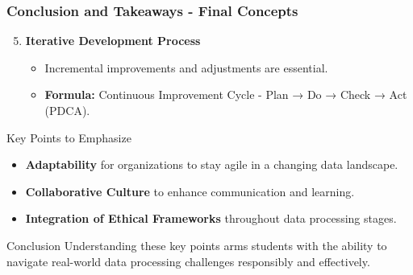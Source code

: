 \documentclass[aspectratio=169]{beamer}
\begin{document}
\begin{frame}[fragile]
    \frametitle{Conclusion and Takeaways - Final Concepts}
    \begin{enumerate}
        \setcounter{enumi}{4} %
        \item \textbf{Iterative Development Process}
        \begin{itemize}
            \item Incremental improvements and adjustments are essential.
            \item \textbf{Formula:} Continuous Improvement Cycle - Plan → Do → Check → Act (PDCA).
        \end{itemize}
    \end{enumerate}
    
    \begin{block}{Key Points to Emphasize}
        \begin{itemize}
            \item \textbf{Adaptability} for organizations to stay agile in a changing data landscape.
            \item \textbf{Collaborative Culture} to enhance communication and learning.
            \item \textbf{Integration of Ethical Frameworks} throughout data processing stages.
        \end{itemize}
    \end{block}

    \begin{block}{Conclusion}
        Understanding these key points arms students with the ability to navigate real-world data processing challenges responsibly and effectively.
    \end{block}
\end{frame}
\end{document}
